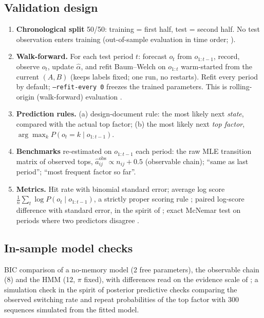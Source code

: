 \documentclass[11pt]{article}
\begin{document}
\subsection{Validation design}
\begin{enumerate}
\item \textbf{Chronological split} 50/50: training = first half, test = second half. No test observation enters training (out-of-sample evaluation in time order; \citealp{tashman2000}).
\item \textbf{Walk-forward.} For each test period $t$: forecast $o_t$ from $o_{1:t-1}$, record, observe $o_t$, update $\hat\alpha$, and refit Baum--Welch on $o_{1:t}$ warm-started from the current $(A,B)$ (keeps labels fixed; one run, no restarts). Refit every period by default; \texttt{--refit-every 0} freezes the trained parameters. This is rolling-origin (walk-forward) evaluation \citep{tashman2000}.
\item \textbf{Prediction rules.} (a) design-document rule: the most likely next \emph{state}, compared with the actual top factor; (b) the most likely next \emph{top factor}, $\arg\max_k P(o_t=k\mid o_{1:t-1})$.
\item \textbf{Benchmarks} re-estimated on $o_{1:t-1}$ each period: the raw MLE transition matrix of observed tops, $\hat a^{\text{obs}}_{ij}\propto n_{ij}+0.5$ (observable chain); ``same as last period''; ``most frequent factor so far''.
\item \textbf{Metrics.} Hit rate with binomial standard error; average log score $\frac1n\sum_t\log P(o_t\mid o_{1:t-1})$, a strictly proper scoring rule \citep{gneiting2007}; paired log-score difference with standard error, in the spirit of \citet{diebold1995}; exact McNemar test on periods where two predictors disagree \citep{mcnemar1947}.
\end{enumerate}

\subsection{In-sample model checks}
BIC \citep{schwarz1978} comparison of a no-memory model (2 free parameters), the observable chain (8) and the HMM (12, $\pi$ fixed), with differences read on the evidence scale of \citet{kass1995}; a simulation check in the spirit of posterior predictive checks \citep{gelman1996} comparing the observed switching rate and repeat probabilities of the top factor with 300 sequences simulated from the fitted model.

\end{document}
